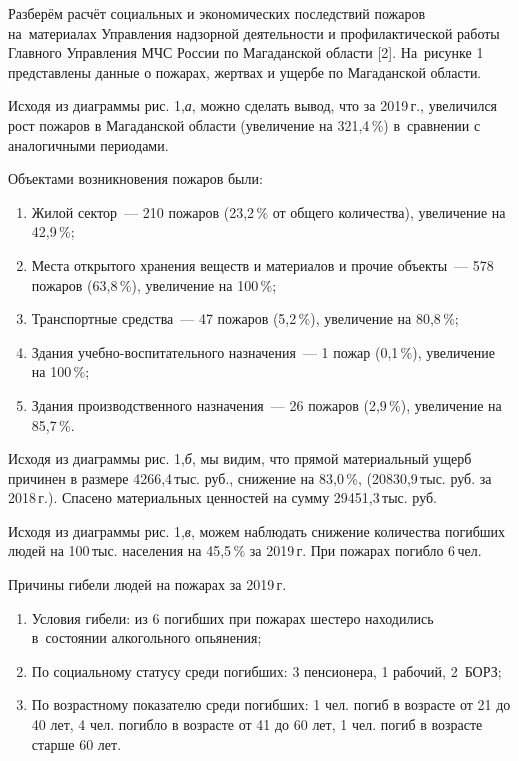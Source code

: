  Разберём расчёт социальных и экономических последствий пожаров на~материалах Управления надзорной деятельности и профилактической работы Главного Управления МЧС России по Магаданской области [2]. На~рисунке 1 представлены данные о пожарах, жертвах и ущербе по Магаданской области.



Исходя из диаграммы рис. 1,\textit{а}, можно сделать вывод, что за 2019\,г., увеличился рост пожаров в Магаданской области (увеличение на 321,4\,\%) в~сравнении с аналогичными периодами.

Объектами возникновения пожаров были:
\begin{enumerate}[noitemsep]\vspace{-8pt}
  \item Жилой сектор~--- 210 пожаров (23,2\,\% от общего количества), увеличение на 42,9\,\%;
    \item Места открытого хранения веществ и материалов и прочие объекты~--- 578 пожаров (63,8\,\%), увеличение на 100\,\%;
      \item Транспортные средства~--- 47 пожаров (5,2\,\%), увеличение на 80,8\,\%;
        \item Здания учебно-воспитательного назначения~--- 1 пожар (0,1\,\%), увеличение на 100\,\%;
          \item Здания производственного назначения~--- 26 пожаров (2,9\,\%), увеличение на 85,7\,\%.
\end{enumerate}
 \vspace{-8pt}

 Исходя из диаграммы рис. 1,\textit{б}, мы видим, что прямой материальный ущерб причинен в размере 4266,4\,тыс. руб., снижение на 83,0\,\%, (20830,9\,тыс. руб. за 2018\,г.). Спасено материальных ценностей на сумму 29451,3\,тыс. руб.

 Исходя из диаграммы рис. 1,\textit{в}, можем наблюдать снижение количества погибших людей на 100\,тыс. населения на 45,5\,\% за 2019\,г. При пожарах погибло 6\,чел.

 Причины гибели людей на пожарах за 2019\,г.
\begin{enumerate}[noitemsep]\vspace{-8pt}
 \item Условия гибели: из 6 погибших при пожарах шестеро находились в~состоянии алкогольного опьянения;
 \item По социальному статусу среди погибших: 3 пенсионера, 1 рабочий, 2~БОРЗ;
 \item По возрастному показателю среди погибших: 1 чел. погиб в возрасте от 21 до 40 лет, 4 чел. погибло в возрасте от 41 до 60 лет, 1 чел. погиб в возрасте старше 60 лет.
\end{enumerate}
\vspace{-6pt}

